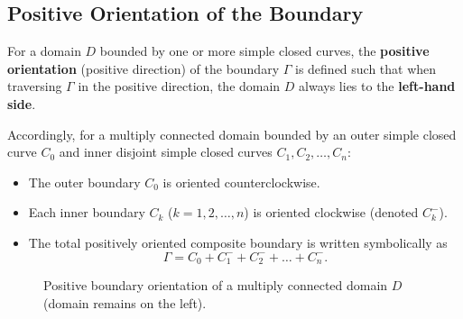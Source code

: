 \documentclass[11pt,a4paper]{article}
\theoremstyle{definitionbreak}
\theoremstyle{examplebreak}
\theoremstyle{plain}
\begin{document}
\subsection{Positive Orientation of the Boundary}

For a domain $D$ bounded by one or more simple closed curves, the \textbf{positive orientation} (positive direction) of the boundary $\Gamma$ is defined such that when traversing $\Gamma$ in the positive direction, the domain $D$ always lies to the \textbf{left-hand side}.

Accordingly, for a multiply connected domain bounded by an outer simple closed curve $C_0$ and inner disjoint simple closed curves $C_1, C_2, \dots, C_n$:
\begin{itemize}
    \item The outer boundary $C_0$ is oriented counterclockwise.
    \item Each inner boundary $C_k$ ($k = 1, 2, \dots, n$) is oriented clockwise (denoted $C_k^-$).
    \item The total positively oriented composite boundary is written symbolically as
    \[
        \Gamma = C_0 + C_1^- + C_2^- + \dots + C_n^-.
    \]
\end{itemize}

\begin{figure}[H]
\centering
{}
\caption{Positive boundary orientation of a multiply connected domain $D$ (domain remains on the left).}
\end{figure}
\end{document}
